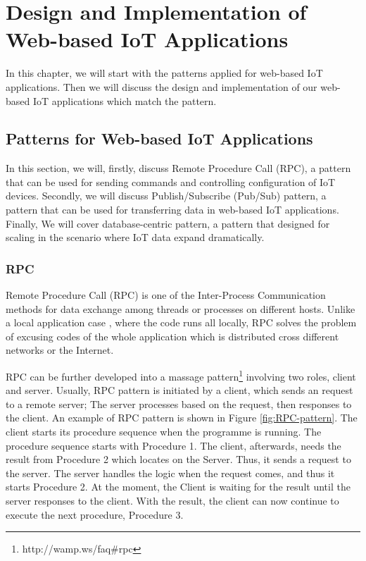 \chapter[Web-based IoT Applications]{Design and Implementation of Web-based IoT Applications}
\label{chapter:Design-and-Implementation-of-Web-based-IoT-Applications}

In this chapter, we will start with the patterns applied for web-based IoT applications. Then we will discuss the design and implementation of our web-based IoT applications which match the pattern.

\section{Patterns for Web-based IoT Applications}
\label{chapter:Patternsforweb-basedIoTapplications}

In this section, we will, firstly, discuss Remote Procedure Call (RPC), a pattern that can be used for sending commands and controlling configuration of IoT devices. Secondly, we will discuss Publish/Subscribe (Pub/Sub) pattern, a pattern that can be used for transferring data in web-based IoT applications. Finally, We will cover database-centric pattern, a pattern that designed for scaling in the scenario where IoT data expand dramatically.

\subsection{RPC}
Remote Procedure Call (RPC) is one of the Inter-Process Communication methods for data exchange among threads or processes on different hosts. Unlike a local application case \cite{srinivasan1995rpc}, where the code runs all locally, RPC solves the problem of excusing codes of the whole application which is distributed cross different networks or the Internet.

RPC can be further developed into a massage pattern\footnote{http://wamp.ws/faq\#rpc} involving two roles, client and server. Usually, RPC pattern is initiated by a client, which sends an request to a remote server; The server processes based on the request, then responses to the client. An example of RPC pattern is shown in Figure \ref{fig:RPC-pattern}. The client starts its procedure sequence when the programme is running. The procedure sequence starts with Procedure 1. The client, afterwards, needs the result from Procedure 2 which locates on the Server. Thus, it sends a request to the server. The server handles the logic when the request comes, and thus it starts Procedure 2. At the moment, the Client is waiting for the result until the server responses to the client. With the result, the client can now continue to execute the next procedure, Procedure 3.  

